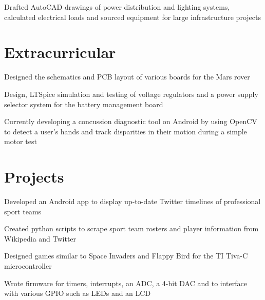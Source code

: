 \documentclass[]{deedy-resume-openfont}
\begin{document}
\begin{minipage}[t]{0.66\textwidth}
\begin{tightemize}
\item Drafted AutoCAD drawings of power distribution and lighting systems, calculated electrical loads and sourced equipment for large infrastructure projects
\end{tightemize}
\sectionsep


\section{Extracurricular}
\begin{tightemize}
\item Designed the schematics and PCB layout of various boards for the Mars rover
\item Design, LTSpice simulation and testing of voltage regulators and a power supply selector system for the battery management board
\end{tightemize}
\sectionsep

\begin{tightemize}
\item Currently developing a concussion diagnostic tool on Android by using OpenCV to detect a user's hands and track disparities in their motion during a simple motor test
\end{tightemize}
\sectionsep


\section{Projects}
\begin{tightemize}
\item Developed an Android app to display up-to-date Twitter timelines of professional sport teams
\item Created python scripts to scrape sport team rosters and player information from Wikipedia and Twitter
\end{tightemize}
\sectionsep

\begin{tightemize}
\item Designed games similar to Space Invaders and Flappy Bird for the TI Tiva-C microcontroller
\item Wrote firmware for timers, interrupts, an ADC, a 4-bit DAC and to interface with various GPIO such as LEDs and an LCD
\end{tightemize}
\sectionsep


\end{minipage} 
\end{document}
